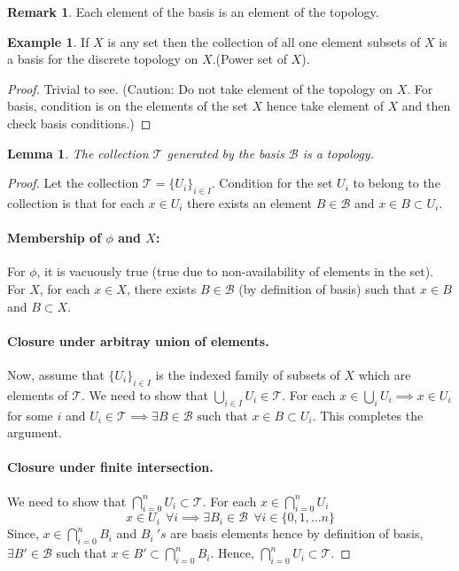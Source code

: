 \documentclass[12pt,reqno]{amsart}
\theoremstyle{plain}
\newtheorem{lem}{Lemma}
\theoremstyle{definition}
\newtheorem{eg}{Example}
\newtheorem{rem}{Remark}
\begin{document}
\begin{rem}
    Each element of the basis is an element of the topology. 
\end{rem}
\begin{eg}
    If $X$ is any set then the collection of all one element subsets of $X$ is a basis for the discrete topology on $X$.(Power set of $X$). 
\end{eg}
\begin{proof}
    Trivial to see. (Caution: Do not take element of the topology on $X$. For basis, condition is on the elements of the set $X$ hence take element of $X$ and then check basis conditions.)
\end{proof}
\begin{lem}
    The collection $\mathcal{T}$ generated by the basis $\mathcal{B}$ is a topology.
\end{lem}
\begin{proof}
    Let the collection $\mathcal{T} = \{U_i\}_{i \in I}$. Condition for the set $U_i$ to belong to the collection is that for each $x \in U_i$ there exists an element $B \in \mathcal{B}$ and $x \in B \subset U_i$.
    \paragraph{\bf Membership of $\phi$ and $X$:}
    For $\phi$, it is vacuously true (true due to non-availability of elements in the set). For $X$, for each $x \in X$, there exists $B \in \mathcal{B}$ (by definition of basis) such that $x \in B$ and $B \subset X$.
    \paragraph{\bf Closure under arbitray union of elements.} Now, assume that $\{U_i\}_{i \in I}$ is the indexed family of subsets of $X$ which are elements of $\mathcal{T}$. We need to show that $\bigcup\limits_{i \in I} U_i \in \mathcal{T}$. For each $x \in \bigcup\limits_{i} U_i \implies x \in U_i$ for some $i$ and $U_i \in \mathcal{T} \implies \exists B \in \mathcal{B} \text{ such that } x \in B \subset U_i$. This completes the argument.
    \paragraph{\bf Closure under finite intersection.} We need to show that $\bigcap\limits_{i = 0}^{n} U_i \subset \mathcal{T}$. For each $x \in \bigcap\limits_{i = 0}^{n} U_i$
    $$ x \in U_i ~~\forall i \implies \exists B_i \in \mathcal{B} ~~\forall i \in \{0,1,\dots n\}$$
    Since, $x \in \bigcap\limits_{i = 0}^{n} B_i$ and $B_i~'s$ are basis elements hence by definition of basis, $\exists B' \in \mathcal{B}$ such that $x \in B' \subset \bigcap\limits_{i = 0}^{n} B_i$. Hence, $\bigcap\limits_{i = 0}^{n} U_i \subset \mathcal{T}$.
\end{proof}
\end{document}
